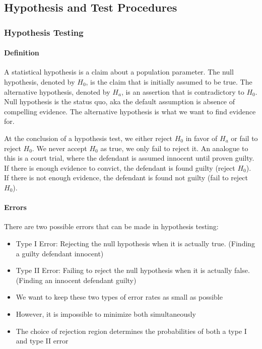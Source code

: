 \subsection{Hypothesis and Test Procedures}
\hrulefill

\subsubsection*{Hypothesis Testing}
\paragraph*{Definition}
A statistical hypothesis is a claim about a population parameter. The null hypothesis, denoted by $H_0$, is the claim that is initially
assumed to be true. The alternative hypothesis, denoted by $H_a$, is an assertion that is contradictory to $H_0$. Null hypothesis is 
the status quo, aka the default assumption is absence of compelling evidence. The alternative hypothesis is what we want to find evidence for.

At the conclusion of a hypothesis test, we either reject $H_0$ in favor of $H_a$ or fail to reject $H_0$. We never accept $H_0$ as true, 
we only fail to reject it. An analogue to this is a court trial, where the defendant is assumed innocent until proven guilty. 
If there is enough evidence to convict, the defendant is found guilty (reject $H_0$). If there is not enough evidence, the defendant is
found not guilty (fail to reject $H_0$).

\paragraph*{Errors}
There are two possible errors that can be made in hypothesis testing:
\begin{itemize}
    \item Type I Error: Rejecting the null hypothesis when it is actually true. (Finding a guilty defendant innocent)
    \item Type II Error: Failing to reject the null hypothesis when it is actually false. (Finding an innocent defendant guilty)
\end{itemize}

\begin{itemize}
    \item We want to keep these two types of error rates as small as possible
    \item However, it is impossible to minimize both simultaneously
    \item The choice of rejection region determines the probabilities of both a type I and type II error
\end{itemize}

